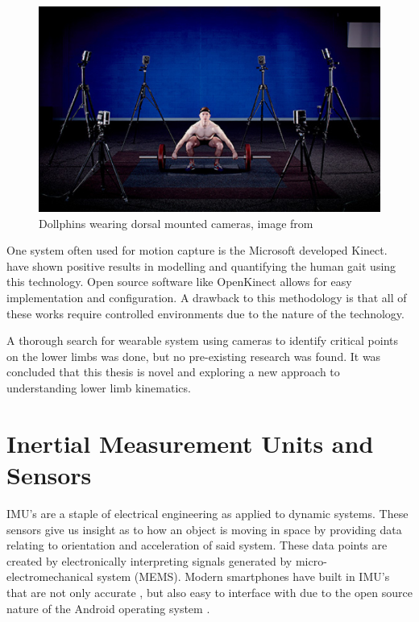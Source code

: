 \begin{figure}[!ht] 
\captionsetup{width=\linewidth, font=small}  
\includegraphics[width=\linewidth]{figures/mc.jpeg}
\caption{Dollphins wearing dorsal mounted cameras, image from \cite{vicon}}
\label{fig:mc}
\end{figure}

One system often used for motion capture is the Microsoft developed Kinect. \cite{gabel2012full} \cite{stone2013unobtrusive} \cite{clark2013concurrent} have shown positive results in modelling and quantifying the human gait using this technology. Open source software like OpenKinect allows for easy implementation and configuration. A drawback to this methodology is that all of these works require controlled environments due to the nature of the technology. 

A thorough search for wearable system using cameras to identify critical points  on the lower limbs was done, but no pre-existing research was found. It was concluded that this thesis is novel and exploring a new approach to understanding lower limb kinematics.


\section{Inertial Measurement Units and Sensors}
IMU's are a staple of electrical engineering as applied to dynamic systems. These sensors give us insight as to how an object is moving in space by providing data relating to orientation and acceleration of said system. These data points are created by electronically interpreting signals generated by micro-electromechanical system (MEMS). Modern smartphones have built in IMU's that are not only accurate \cite{gikas2016rigorous}, but also easy to interface with due to the open source nature of the Android operating system \cite{androidSensorLib}.  

